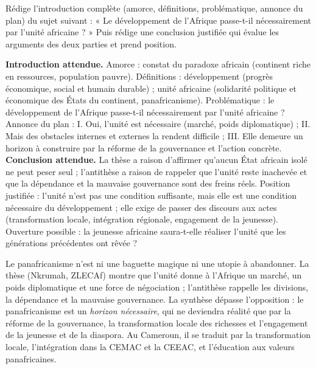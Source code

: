 \documentclass[11pt]{article}
\begin{document}
\begin{exercice}
Rédige l'introduction complète (amorce, définitions, problématique, annonce du plan) du sujet suivant : « Le développement de l'Afrique passe-t-il nécessairement par l'unité africaine ? » Puis rédige une conclusion justifiée qui évalue les arguments des deux parties et prend position.
\end{exercice}

\begin{corrige}
\textbf{Introduction attendue.} Amorce : constat du paradoxe africain (continent riche en ressources, population pauvre). Définitions : développement (progrès économique, social et humain durable) ; unité africaine (solidarité politique et économique des États du continent, panafricanisme). Problématique : le développement de l'Afrique passe-t-il nécessairement par l'unité africaine ? Annonce du plan : I. Oui, l'unité est nécessaire (marché, poids diplomatique) ; II. Mais des obstacles internes et externes la rendent difficile ; III. Elle demeure un horizon à construire par la réforme de la gouvernance et l'action concrète.
\textbf{Conclusion attendue.} La thèse a raison d'affirmer qu'aucun État africain isolé ne peut peser seul ; l'antithèse a raison de rappeler que l'unité reste inachevée et que la dépendance et la mauvaise gouvernance sont des freins réels. Position justifiée : l'unité n'est pas une condition suffisante, mais elle est une condition nécessaire du développement ; elle exige de passer des discours aux actes (transformation locale, intégration régionale, engagement de la jeunesse). Ouverture possible : la jeunesse africaine saura-t-elle réaliser l'unité que les générations précédentes ont rêvée ?
\end{corrige}

\begin{aretenir}
Le panafricanisme n'est ni une baguette magique ni une utopie à abandonner. La thèse (Nkrumah, ZLECAf) montre que l'unité donne à l'Afrique un marché, un poids diplomatique et une force de négociation ; l'antithèse rappelle les divisions, la dépendance et la mauvaise gouvernance. La synthèse dépasse l'opposition : le panafricanisme est un \emph{horizon nécessaire}, qui ne deviendra réalité que par la réforme de la gouvernance, la transformation locale des richesses et l'engagement de la jeunesse et de la diaspora. Au Cameroun, il se traduit par la transformation locale, l'intégration dans la CEMAC et la CEEAC, et l'éducation aux valeurs panafricaines.
\end{aretenir}
\end{document}
